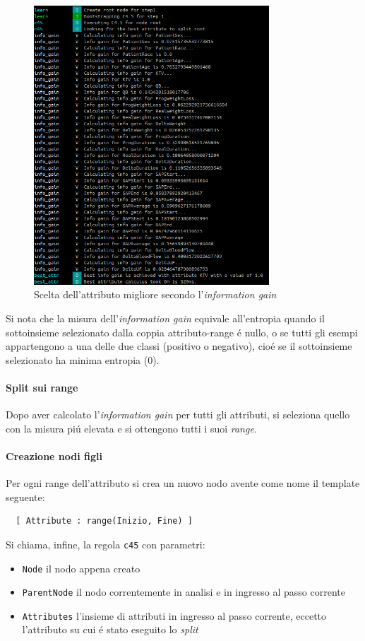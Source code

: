 \documentclass[preprint]{acm_proc_article-sp}
\begin{document}
\begin{figure}[!htb]
\centering
\includegraphics[width=250pt]{figures/prolog-best-attribute.png}
\caption{Scelta dell'attributo migliore secondo l'\textit{information gain}}
\label{fig:prolog-best-attribute}
\end{figure}

Si nota che la misura dell'\textit{information gain} equivale all'entropia quando il sottoinsieme selezionato dalla coppia attributo-range \'e nullo, o se tutti gli esempi appartengono a una delle due classi (positivo o negativo), cio\'e se il sottoinsieme selezionato ha minima entropia ($0$).

\paragraph{Split sui range}
Dopo aver calcolato l'\textit{information gain} per tutti gli attributi, si seleziona quello con la misura pi\'u elevata e si ottengono tutti i suoi \textit{range}.

\paragraph{Creazione nodi figli}
Per ogni range dell'attributo si crea un nuovo nodo avente come nome il template seguente:
\begin{verbatim}
  [ Attribute : range(Inizio, Fine) ]
\end{verbatim}
Si chiama, infine, la regola \verb|c45| con parametri:
\begin{itemize}
\item \verb|Node| il nodo appena creato
\item \verb|ParentNode| il nodo correntemente in analisi e in ingresso al passo corrente
\item \verb|Attributes| l'insieme di attributi in ingresso al passo corrente, eccetto l'attributo su cui \'e stato eseguito lo \textit{split}
\end{itemize}
\end{document}
